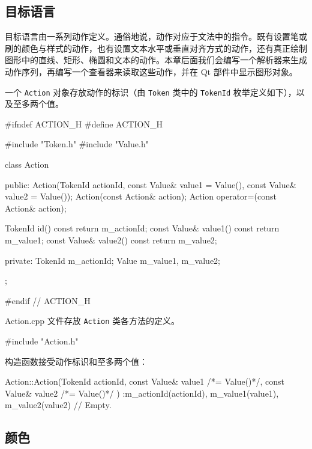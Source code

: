 \subsection{目标语言}

目标语言由一系列动作定义。通俗地说，动作对应于文法中的指令。既有设置笔或刷的颜色与样式的动作，也有设置文本水平或垂直对齐方式的动作，还有真正绘制图形中的直线、矩形、椭圆和文本的动作。本章后面我们会编写一个解析器来生成动作序列，再编写一个查看器来读取这些动作，并在 Qt 部件中显示图形对象。

一个 \texttt{Action} 对象存放动作的标识（由 \texttt{Token} 类中的 \texttt{TokenId} 枚举定义如下），以及至多两个值。

\medskip{}

\begin{codebox}
#ifndef ACTION_H
#define ACTION_H

#include "Token.h"
#include "Value.h"

class Action {
  public:
    Action(TokenId actionId, const Value& value1 = Value(),
           const Value& value2 = Value());
    Action(const Action& action);
    Action operator=(const Action& action);

    TokenId id() const {return m_actionId;}
    const Value& value1() const {return m_value1;}
    const Value& value2() const {return m_value2;}

  private:
    TokenId m_actionId;
    Value m_value1, m_value2;
};

#endif // ACTION_H
\end{codebox}

Action.cpp 文件存放 \texttt{Action} 类各方法的定义。

\medskip{}

\begin{codebox}
#include "Action.h"
\end{codebox}

构造函数接受动作标识和至多两个值：

\begin{codebox}
Action::Action(TokenId actionId,
               const Value& value1 /*= Value()*/,
               const Value& value2 /*= Value()*/ )
  :m_actionId(actionId),
   m_value1(value1),
   m_value2(value2) {
  // Empty.
}
\end{codebox}

\subsection{颜色}

